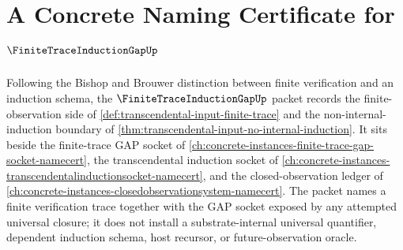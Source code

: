 \chapter{A Concrete Naming Certificate for $\FiniteTraceInductionGapUp$}
\label{ch:concrete-instances-finite-trace-induction-gap-namecert}

Following the Bishop and Brouwer distinction between finite verification and an induction schema, the $\FiniteTraceInductionGapUp$ packet records the finite-observation side of \autoref{def:transcendental-input-finite-trace} and the non-internal-induction boundary of \autoref{thm:transcendental-input-no-internal-induction}. It sits beside the finite-trace GAP socket of \autoref{ch:concrete-instances-finite-trace-gap-socket-namecert}, the transcendental induction socket of \autoref{ch:concrete-instances-transcendentalinductionsocket-namecert}, and the closed-observation ledger of \autoref{ch:concrete-instances-closedobservationsystem-namecert}. The packet names a finite verification trace together with the GAP socket exposed by any attempted universal closure; it does not install a substrate-internal universal quantifier, dependent induction schema, host recursor, or future-observation oracle.

